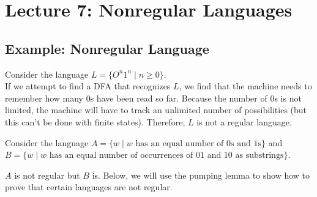 \documentclass[11pt,a4paper]{article}
\begin{document}
\section{Lecture 7: Nonregular Languages}

\subsection{Example: Nonregular Language}
\begin{example}
    Consider the language $L=\{O^n1^n\mid n\geq 0\}$. \\

    If we attempt to find a DFA that recognizes $L$, we find that the machine needs to remember how many 0s have been read so far.
    Because the number of 0s is not limited, the machine will have to track an unlimited number of possibilities (but this can't be done with finite states).
    Therefore, $L$ is not a regular language.
\end{example}

\begin{example}
    Consider the language $A=\{w\mid w\text{ has an equal number of 0s and 1s}\}$ and $B=\{w\mid w\text{ has an equal number of occurrences of 01 and 10 as substrings}\}$.

    $A$ is not regular but $B$ is. Below, we will use the pumping lemma to show how to prove that certain languages are not regular.
\end{example}
\end{document}
